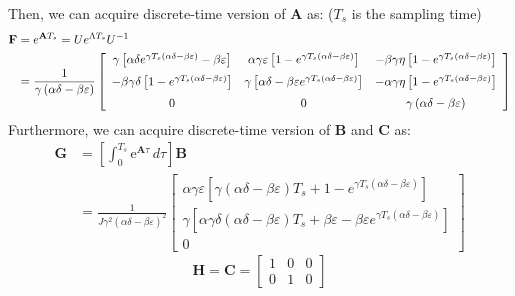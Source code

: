 \documentclass[letterpaper,12pt]{article}
\begin{document}
\par
Then, we can acquire discrete-time version of $\mathbf{A}$ as: ($T_s$ is the sampling time)
\begin{align*}
\mathbf{F} & = e^{\mathbf{A}T_s} = U e^{\Lambda T_s} U^{-1} \\
&= \frac{1}{\gamma\left(\alpha\delta-\beta\varepsilon\right)}
\left[\begin{array}{ccc} 
\gamma\left[\alpha\delta e^{\gamma T_s \left(\alpha\delta-\beta\varepsilon\right)}-\beta\varepsilon\right] & \alpha\gamma\varepsilon\left[ 1 -  e^{\gamma T_s \left(\alpha\delta-\beta\varepsilon\right)} \right] & - \beta\gamma\eta\left[1 -  e^{\gamma T_s \left(\alpha\delta-\beta\varepsilon\right)} \right]\\[\medskipamount] 
 - \beta\gamma\delta\left[1 -  e^{\gamma T_s \left(\alpha\delta-\beta\varepsilon\right)} \right] & \gamma\left[\alpha\delta -\beta\varepsilon e^{\gamma T_s \left(\alpha\delta-\beta\varepsilon\right)}\right] & - \alpha\gamma\eta\left[1 -  e^{\gamma T_s \left(\alpha\delta-\beta\varepsilon\right)} \right]\\[\medskipamount]  
0 & 0 & \gamma\left(\alpha\delta-\beta\varepsilon\right) 
\end{array}\right]
\end{align*}
\newpage
Furthermore, we can acquire discrete-time version of $\mathbf{B}$ and $\mathbf{C}$ as: 
\begin{align*}
\mathbf{G} &=  \left[\int_{0}^{T_s} \mathrm{e}^{\mathbf{A}\tau}\, d\tau\right] \mathbf{B} \\
&= \frac{1}{ J \gamma^2 \left(\alpha\delta-\beta\varepsilon\right)^2}
\left[\begin{array}{c} 
\alpha\gamma\varepsilon\left[ \gamma \left(\alpha\delta-\beta\varepsilon\right) T_s + 1 -  e^{\gamma T_s \left(\alpha\delta-\beta\varepsilon\right)} \right] \\
\gamma\left[\alpha \gamma \delta \left(\alpha\delta-\beta\varepsilon\right) T_s  + \beta\varepsilon - \beta\varepsilon e^{\gamma T_s \left(\alpha\delta-\beta\varepsilon\right)}\right] \\
0
\end{array}\right]
\end{align*} 
\begin{equation*}
\mathbf{H} = \mathbf{C} = 
\left[
\begin{array}{ccc}
1 & 0 & 0 \\
0 & 1 & 0
\end{array}
\right]
\end{equation*}
\end{document}
